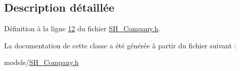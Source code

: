 \subsection{Description détaillée}


Définition à la ligne \hyperlink{SH__Company_8h_source_l00012}{12} du fichier \hyperlink{SH__Company_8h_source}{S\-H\-\_\-\-Company.\-h}.



La documentation de cette classe a été générée à partir du fichier suivant \-:\begin{DoxyCompactItemize}
\item 
models/\hyperlink{SH__Company_8h}{S\-H\-\_\-\-Company.\-h}\end{DoxyCompactItemize}
